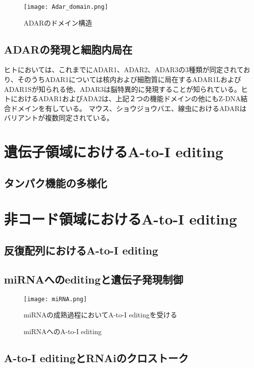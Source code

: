 \begin{figure}[htbp]
	\begin{center}
		\texttt{[image: Adar\_domain.png]}
	\end{center}
	\caption{ADARのドメイン構造}
\end{figure}

\subsection{ADARの発現と細胞内局在}
ヒトにおいては、これまでにADAR1、ADAR2、ADAR3の3種類が同定されており、そのうちADAR1については核内および細胞質に局在するADAR1LおよびADAR1Sが知られる他、ADAR3は脳特異的に発現することが知られている。ヒトにおけるADAR1およびADA2は、上記２つの機能ドメインの他にもZ-DNA結合ドメインを有している。
マウス、ショウジョウバエ、線虫におけるADARはバリアントが複数同定されている。

\section{遺伝子領域におけるA-to-I editing}
\subsection{タンパク機能の多様化}

\section{非コード領域におけるA-to-I editing}
\subsection{反復配列におけるA-to-I editing}

\subsection{miRNAへのeditingと遺伝子発現制御}
\begin{figure}[htbp]
	\begin{center}
		\texttt{[image: miRNA.png]}
	\end{center}
	\caption{miRNAへのA-to-I editing}
	\begin{flushleft}
		\small{miRNAの成熟過程においてA-to-I editingを受ける}
	\end{flushleft}
	\label{fig:miRNA}
\end{figure}

\subsection{A-to-I editingとRNAiのクロストーク}

